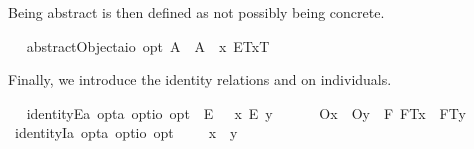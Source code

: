 \begin{isabellebody}
\begin{isamarkuptext}%
Being abstract is then defined as not possibly being concrete.%
\end{isamarkuptext}\isamarkuptrue%
\ \isamarkupfalse%
\ abstractObject{\isacharcolon}{\isacharcolon}{\isachardoublequoteopen}{\isacharparenleft}{\isacharprime}a{\isasymRightarrow}io{\isacharparenright}\ opt{\isachardoublequoteclose}\ {\isacharparenleft}{\isachardoublequoteopen}A{\isacharbang}{\isachardoublequoteclose}{\isacharparenright}\ \ {\isachardoublequoteopen}A{\isacharbang}\ {\isasymequiv}\ \isactrlbold {\isasymlambda}x{\isachardot}\ \isactrlbold {\isasymnot}{\isacharparenleft}\isactrlbold {\isasymdiamond}{\isasymlparr}E{\isacharbang}\isactrlsup T{\isacharcomma}x\isactrlsup T{\isasymrparr}{\isacharparenright}{\isachardoublequoteclose}%
\begin{isamarkuptext}%
Finally, we introduce the identity relations  and \isa{\isactrlbold {\isacharequal}} on individuals.%
\end{isamarkuptext}\isamarkuptrue%
\ \isamarkupfalse%
\ identityE{\isacharcolon}{\isacharcolon}{\isachardoublequoteopen}{\isacharprime}a\ opt{\isasymRightarrow}{\isacharprime}a\ opt{\isasymRightarrow}io\ opt{\isachardoublequoteclose}\ {\isacharparenleft}\ {\isachardoublequoteopen}\isactrlbold {\isacharequal}\isactrlsub E{\isachardoublequoteclose}\ {}{}{\isacharparenright}\ \ {\isachardoublequoteopen}x\ \isactrlbold {\isacharequal}\isactrlsub E\ y\ {\isasymequiv}\ \isanewline
\ \ \ \ {\isasymlparr}O{\isacharbang}{\isacharcomma}x{\isasymrparr}\ \isactrlbold {\isasymand}\ {\isasymlparr}O{\isacharbang}{\isacharcomma}y{\isasymrparr}\ \isactrlbold {\isasymand}\ \isactrlbold {\isasymbox}{\isacharparenleft}\isactrlbold {\isasymforall}F{\isachardot}\ {\isasymlparr}F\isactrlsup T{\isacharcomma}x{\isasymrparr}\ \isactrlbold {\isasymequiv}\ {\isasymlparr}F\isactrlsup T{\isacharcomma}y{\isasymrparr}{\isacharparenright}{\isachardoublequoteclose}\isanewline
\isanewline
\ \isamarkupfalse%
\ identityI{\isacharcolon}{\isacharcolon}{\isachardoublequoteopen}{\isacharprime}a\ opt{\isasymRightarrow}{\isacharprime}a\ opt{\isasymRightarrow}io\ opt{\isachardoublequoteclose}\ {\isacharparenleft}\ {\isachardoublequoteopen}\isactrlbold {\isacharequal}{\isachardoublequoteclose}\ {}{}{\isacharparenright}\ \ {\isachardoublequoteopen}x\ \isactrlbold {\isacharequal}\ y\ {\isasymequiv}\ \isanewline

\end{isabellebody}

